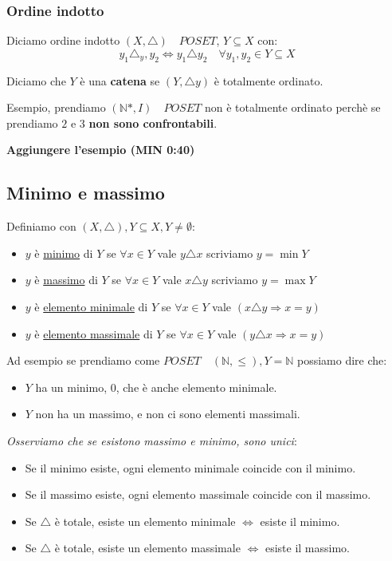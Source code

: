 \documentclass{article}
\theoremstyle{definition}
\begin{document}
\subsubsection{Ordine indotto}
Diciamo ordine indotto $(X, \triangle) \quad POSET$, $ Y \subseteq X$ con:
\begin{equation*}
        y_1 \triangle_y,y_2 \Leftrightarrow y_1 \triangle y_2 \quad \forall y_1,y_2 \in Y \subseteq X
\end{equation*}

Diciamo che $Y$ è una \textbf{catena} se $(Y, \triangle y)$ è totalmente ordinato. \par

Esempio, prendiamo $(\mathbb{N}*, I) \quad POSET$ non è totalmente ordinato perchè se prendiamo $2$ e $3$ \textbf{non sono confrontabili}. \par
\textbf{Aggiungere l'esempio (MIN 0:40)}



\subsection{Minimo e massimo}
Definiamo con $(X, \triangle), Y \subseteq X, Y \not = \emptyset$:
\begin{itemize}
        \item $y$ è \underline{minimo} di $Y$ se $\forall x \in Y$  vale $y \triangle x$ scriviamo $y = \min Y$
        \item $y$ è \underline{massimo} di $Y$ se $\forall x \in Y$  vale $x \triangle y$ scriviamo $y = \max Y$
        \item $y$ è \underline{elemento minimale} di $Y$ se $\forall x \in Y$  vale $(x \triangle y \Rightarrow x = y)$
        \item $y$ è \underline{elemento massimale} di $Y$ se $\forall x \in Y$  vale $(y \triangle x \Rightarrow x = y)$
\end{itemize}

Ad esempio se prendiamo come $POSET \quad (\mathbb{N}, \le), Y = \mathbb{N}$ possiamo dire che:
\begin{itemize}
        \item $Y$ ha un minimo, $0$, che è anche elemento minimale.
        \item $Y$ non ha un massimo, e non ci sono elementi massimali. 
\end{itemize}

\textit{Osserviamo che se esistono massimo e minimo, sono unici}:
\begin{itemize}
        \item Se il minimo esiste, ogni elemento minimale coincide con il minimo.
        \item Se il massimo esiste, ogni elemento massimale coincide con il massimo.
        \item Se $\triangle$ è totale, esiste un elemento minimale $\Leftrightarrow$ esiste il minimo.
        \item Se $\triangle$ è totale, esiste un elemento massimale $\Leftrightarrow$ esiste il massimo. 
\end{itemize}
\end{document}
